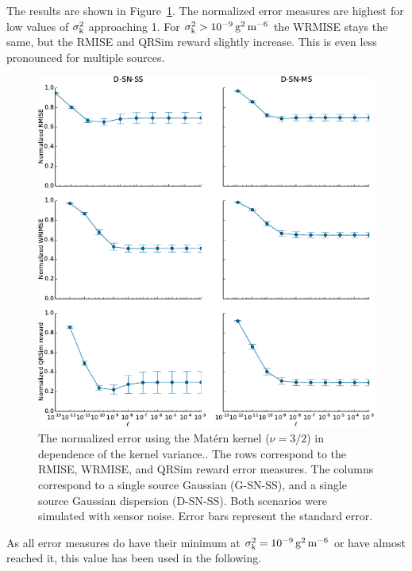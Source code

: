 The results are shown in Figure~\ref{fig:kvar}. The normalized error measures 
are highest for low values of $\sigma_{\mathrm{k}}^2$ approaching 1. For 
$\sigma\ped{k}^2 > \SI{1e-9}{\gram\squared\per\meter\tothe{6}}$ the WRMISE stays 
the same, but the RMISE and QRSim reward slightly increase. This is even less 
pronounced for multiple sources.

\begin{figure}
    \centering
    \includegraphics{plots/kvar}
    \caption[Influence of the kernel variance]{The normalized error using the 
        Mat\'ern kernel ($\nu = 3/2$) in dependence of the kernel variance..  
        The rows correspond to the RMISE, WRMISE, and QRSim reward error 
        measures.  The columns correspond to a single source Gaussian (G-SN-SS), 
        and a single source Gaussian dispersion (D-SN-SS). Both scenarios were 
        simulated with sensor noise.  Error bars represent the standard 
        error.}\label{fig:kvar}
\end{figure}

As all error measures do have their minimum at $\sigma\ped{k}^2 
= \SI{1e-9}{\gram\squared\per\meter\tothe{6}}$ or have almost reached it, this 
value has been used in the following.

